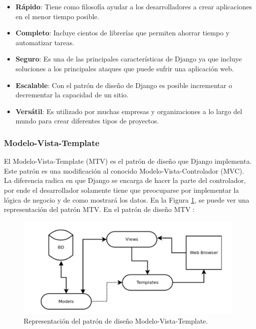\begin{itemize}
    \item \textbf{Rápido}: Tiene como filosofía ayudar a los desarrolladores a crear aplicaciones en el menor tiempo posible.
    \item \textbf{Completo}: Incluye cientos de librerías que permiten ahorrar tiempo y automatizar tareas.
    \item \textbf{Seguro}: Es una de las principales características de Django ya que incluye soluciones a los principales ataques que puede sufrir una aplicación web.
    \item \textbf{Escalable}: Con el patrón de diseño de Django es posible incrementar o decrementar la capacidad de un sitio.
    \item \textbf{Versátil}: Es utilizado por muchas empresas y organizaciones a lo largo del mundo para crear diferentes tipos de proyectos.
\end{itemize}

\subsubsection{Modelo-Vista-Template}
El Modelo-Vista-Template (MTV) es el patrón de diseño que Django implementa. Este patrón es una modificación al conocido Modelo-Vista-Controlador (MVC). La diferencia radica en que Django se encarga de hacer la parte del controlador, por ende el desarrollador solamente tiene que preocuparse por implementar la lógica de negocio y de como mostrará los datos. En la Figura \ref{fig:mtv}, se puede ver una representación del patrón MTV. En el patrón de diseño MTV \cite{mtv}:

\begin{figure}
    \centering
    \includegraphics[width=\textwidth]{capitulo2/images/mtv.png}
    \caption{Representación del patrón de diseño Modelo-Vista-Template.}
    \label{fig:mtv}
\end{figure}


